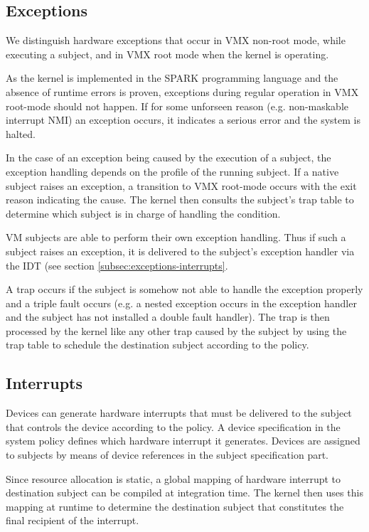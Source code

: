 \subsection{Exceptions}\label{subsec:design-exceptions}
We distinguish hardware exceptions that occur in VMX non-root mode, while
executing a subject, and in VMX root mode when the kernel is operating.

As the kernel is implemented in the SPARK programming language and the absence
of runtime errors is proven, exceptions during regular operation in VMX
root-mode should not happen. If for some unforseen reason (e.g. non-maskable
interrupt NMI) an exception occurs, it indicates a serious error and the system
is halted.

In the case of an exception being caused by the execution of a subject, the
exception handling depends on the profile of the running subject. If a native
subject raises an exception, a transition to VMX root-mode occurs with the exit
reason indicating the cause. The kernel then consults the subject's trap table
to determine which subject is in charge of handling the condition.

VM subjects are able to perform their own exception handling. Thus if such a
subject raises an exception, it is delivered to the subject's exception handler
via the IDT (see section \ref{subsec:exceptions-interrupts}.

A trap occurs if the subject is somehow not able to handle the exception
properly and a triple fault occurs (e.g. a nested exception occurs in the
exception handler and the subject has not installed a double fault handler).
The trap is then processed by the kernel like any other trap caused by the
subject by using the trap table to schedule the destination subject according to
the policy.

\subsection{Interrupts}
Devices can generate hardware interrupts that must be delivered to the subject
that controls the device according to the policy. A device specification in the
system policy defines which hardware interrupt it generates. Devices are
assigned to subjects by means of device references in the subject specification
part.

Since resource allocation is static, a global mapping of hardware interrupt to
destination subject can be compiled at integration time. The kernel then uses
this mapping at runtime to determine the destination subject that constitutes
the final recipient of the interrupt.

